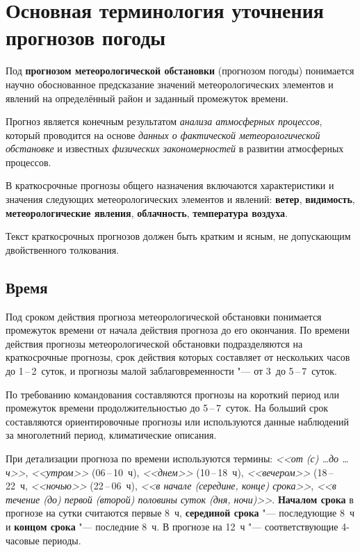 \documentclass[a4paper, 12pt, twoside, final, book, russian, fittopage, cyremdash, openright]{ncc}
\newcommand{\otdo}{\,--\,}
\begin{document}
\chapter{Основная терминология уточнения прогнозов погоды}

Под \textbf{прогнозом метеорологической обстановки} (прогнозом погоды) понимается научно обоснованное
предсказание значений метеорологических элементов и явлений на
определённый район и заданный промежуток времени.

Прогноз является конечным результатом \textit{анализа атмосферных
  процессов}, который проводится на основе \textit{данных о
  фактической метеорологической обстановке} и известных
\textit{физических закономерностей} в развитии атмосферных процессов.

В краткосрочные прогнозы общего назначения включаются характеристики и
значения следующих метеорологических элементов и явлений:
\textbf{ветер}, \textbf{видимость}, \textbf{метеорологические
  явления}, \textbf{облачность}, \textbf{температура воздуха}.

Текст краткосрочных прогнозов должен быть кратким и ясным, не
допускающим двойственного толкования.

\section{Время}
\label{sec:time}

Под сроком действия прогноза метеорологической обстановки понимается
промежуток времени от начала действия прогноза до его окончания. По
времени действия прогнозы метеорологической обстановки подразделяются
на краткосрочные прогнозы, срок действия которых составляет от
нескольких часов до 1\otdo2~суток, и прогнозы малой заблаговременности
"--- от 3~до 5\otdo7~суток.

По требованию командования составляются прогнозы на короткий период
или промежуток времени продолжительностью до 5\otdo7~суток. На больший
срок составляются ориентировочные прогнозы или используются данные
наблюдений за многолетний период, климатические описания.

При детализации прогноза по времени используются термины: \textit{<<от
  (с) \ldots до \ldots ч>>}, \textit{<<утром>>} (06\otdo10~ч),
\textit{<<днем>>} (10\otdo18~ч), \textit{<<вечером>>} (18\otdo22~ч,
\textit{<<ночью>>} (22\otdo06~ч), \textit{<<в начале (середине, конце)
  срока>>}, \textit{<<в течение (до) первой (второй) половины суток
  (дня, ночи)>>}. \textbf{Началом срока} в прогнозе на сутки считаются
первые 8~ч, \textbf{серединой срока} "--- последующие 8~ч и
\textbf{концом срока} "--- последние 8~ч. В прогнозе на 12~ч "---
соответствующие 4-часовые периоды.
\end{document}
